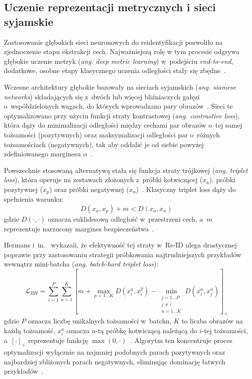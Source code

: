 \subsection{Uczenie reprezentacji metrycznych i sieci syjamskie}
\label{subsec:metric_learning_reid}

Zastosowanie głębokich sieci neuronowych do reidentyfikacji pozwoliło na zjednoczenie etapu
ekstrakcji cech. Najważniejszą rolę w tym procesie odgrywa głębokie uczenie metryk (\textit{ang.
  deep metric learning}) w~podejściu \textit{end-to-end}, dodatkowe, osobne etapy klasycznego uczenia
odległości stały się zbędne~\cite{hermans2017defense}.

Wczesne architektury głębokie bazowały na sieciach syjamskich (\textit{ang. siamese networks})
składających się z~dwóch lub więcej bliźniaczych gałęzi o~współdzielonych wagach, do których
wprowadzano pary obrazów~\cite{zheng2017wild}. Sieci te optymalizowano przy użyciu funkcji straty
kontrastowej (\textit{ang. contrastive loss}), która dąży do minimalizacji odległości między
cechami par obrazów o~tej samej tożsamości (pozytywnych) oraz maksymalizacji odległości par
o~różnych tożsamościach (negatywnych), tak aby oddalić je od siebie powyżej zdefiniowanego
marginesu $\alpha$~\cite{zheng2017wild}.

Powszechnie stosowaną alternatywą stała się funkcja straty trójkowej (\textit{ang. triplet loss}),
która operuje na zestawach złożonych z~próbki kotwiczącej ($x_a$), próbki pozytywnej ($x_p$) oraz
próbki negatywnej ($x_n$)~\cite{hermans2017defense}. Klasyczny triplet loss dąży do spełnienia
warunku:
\begin{equation}
  D(x_a, x_p) + m < D(x_a, x_n)
  \label{eq:triplet_loss}
\end{equation}
gdzie $D(\cdot, \cdot)$ oznacza euklidesową odległość w~przestrzeni cech, a~$m$ reprezentuje narzucony margines bezpieczeństwa~\cite{hermans2017defense}.

Hermans i~in.~\cite{hermans2017defense} wykazali, że efektywność tej straty w~Re-ID ulega
drastycznej poprawie przy zastosowaniu strategii próbkowania najtrudniejszych przykładów wewnątrz
mini-batcha (\textit{ang. batch-hard triplet loss}):
\begin{equation}
  \mathcal{L}_{BH} = \sum_{i=1}^{P} \sum_{a=1}^{K}
  \left[ m + \max_{p=1 \dots K} D(x_i^a, x_i^p) - \min_{\substack{j=1 \dots P \\ j \neq i \\ n=1 \dots K}} D(x_i^a, x_j^n) \right]_+
  \label{eq:batch_hard_triplet}
\end{equation}
gdzie $P$ oznacza liczbę unikalnych tożsamości w~batchu, $K$ to liczba obrazów na każdą tożsamość, $x_i^a$ oznacza $a$-tą próbkę kotwiczącą należącą do $i$-tej tożsamości, a~$[\cdot]_+$ reprezentuje funkcję $\max(0, \cdot)$~\cite{hermans2017defense}. Algorytm ten koncentruje proces optymalizacji wyłącznie na najmniej podobnych parach pozytywnych oraz najbardziej zbliżonych parach negatywnych, eliminując dominację łatwych przykładów~\cite{hermans2017defense}.

